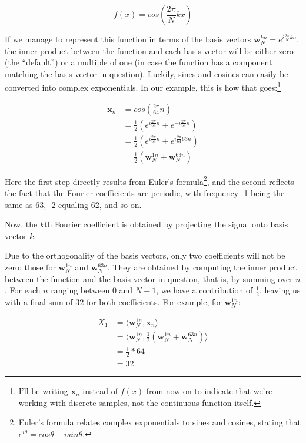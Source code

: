 \documentclass[
  letterpaper,
]{krantz}
\begin{document}
\[
f(x) = cos(\frac{2 \pi}{N} k x)
\]

If we manage to represent this function in terms of the basis vectors
\(\mathbf{w}^{kn}_N = e^{i\frac{2 \pi}{N}k n}\), the inner product
between the function and each basis vector will be either zero (the
``default'') or a multiple of one (in case the function has a component
matching the basis vector in question). Luckily, sines and cosines can
easily be converted into complex exponentials. In our example, this is
how that goes:\footnote{I'll be writing \(\mathbf{x}_n\) instead of
  \(f(x)\) from now on to indicate that we're working with discrete
  samples, not the continuous function itself.}

\[
\begin{aligned}
\mathbf{x}_n &= cos(\frac{2 \pi}{64} n) \\
&= \frac{1}{2} (e^{i\frac{2 \pi}{64} n} + e^{-i\frac{2 \pi}{64} n}) \\
&= \frac{1}{2} (e^{i\frac{2 \pi}{64} n} + e^{i\frac{2 \pi}{64} 63n}) \\
&= \frac{1}{2} (\mathbf{w}^{1n}_N + \mathbf{w}^{63n}_N)
\end{aligned}
\]

Here the first step directly results from Euler's formula\footnote{Euler's
  formula relates complex exponentials to sines and cosines, stating
  that \(e^{i \theta} = cos \theta + i sin \theta\).}, and the second
reflects the fact that the Fourier coefficients are periodic, with
frequency -1 being the same as 63, -2 equaling 62, and so on.

Now, the \(k\)th Fourier coefficient is obtained by projecting the
signal onto basis vector \(k\).

Due to the orthogonality of the basis vectors, only two coefficients
will not be zero: those for \(\mathbf{w}^{1n}_N\) and
\(\mathbf{w}^{63n}_N\). They are obtained by computing the inner product
between the function and the basis vector in question, that is, by
summing over \(n\). For each \(n\) ranging between \(0\) and \(N-1\), we
have a contribution of \(\frac{1}{2}\), leaving us with a final sum of
\(32\) for both coefficients. For example, for \(\mathbf{w}^{1n}_N\):

\[
\begin{aligned}
X_1 &= \langle \mathbf{w}^{1n}_N, \mathbf{x}_n \rangle \\
&= \langle \mathbf{w}^{1n}_N, \frac{1}{2} (\mathbf{w}^{1n}_N + \mathbf{w}^{63n}_N) \rangle \\
&= \frac{1}{2} * 64 \\
&= 32
\end{aligned}
\]
\end{document}
